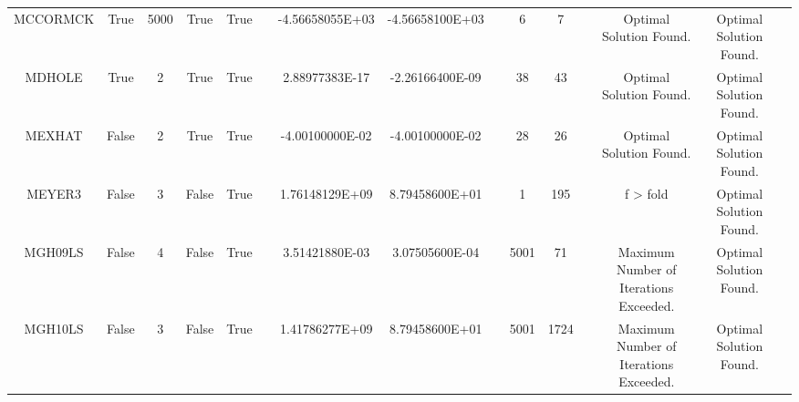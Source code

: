 \begin{longtable}{ccccccccccccccc}
	\cellcolor{default2} MCCORMCK& \cellcolor{default2} True& \cellcolor{default2} 5000& \cellcolor{default2} True& \cellcolor{default2} True& \cellcolor{header} & \cellcolor{ok} -4.56658055E+03& \cellcolor{best} -4.56658100E+03& \cellcolor{header} & \cellcolor{best} 6& \cellcolor{ok} 7& \cellcolor{header} & \cellcolor{default2} Optimal Solution Found.& \cellcolor{default2} Optimal Solution Found.& \cellcolor{header} \\
	\cellcolor{default1} MDHOLE& \cellcolor{default1} True& \cellcolor{default1} 2& \cellcolor{default1} True& \cellcolor{default1} True& \cellcolor{header} & \cellcolor{ok} 2.88977383E-17& \cellcolor{best} -2.26166400E-09& \cellcolor{header} & \cellcolor{best} 38& \cellcolor{ok} 43& \cellcolor{header} & \cellcolor{default1} Optimal Solution Found.& \cellcolor{default1} Optimal Solution Found.& \cellcolor{header} \\
	\cellcolor{default2} MEXHAT& \cellcolor{default2} False& \cellcolor{default2} 2& \cellcolor{default2} True& \cellcolor{default2} True& \cellcolor{header} & \cellcolor{best} -4.00100000E-02& \cellcolor{best} -4.00100000E-02& \cellcolor{header} & \cellcolor{ok} 28& \cellcolor{best} 26& \cellcolor{header} & \cellcolor{default2} Optimal Solution Found.& \cellcolor{default2} Optimal Solution Found.& \cellcolor{header} \\
	\cellcolor{default1} MEYER3& \cellcolor{default1} False& \cellcolor{default1} 3& \cellcolor{default1} False& \cellcolor{default1} True& \cellcolor{header} & \cellcolor{poor} 1.76148129E+09& \cellcolor{best} 8.79458600E+01& \cellcolor{header} & \cellcolor{best} 1& \cellcolor{poor} 195& \cellcolor{header} & \cellcolor{default1} f > fold& \cellcolor{default1} Optimal Solution Found.& \cellcolor{header} \\
	\cellcolor{default2} MGH09LS& \cellcolor{default2} False& \cellcolor{default2} 4& \cellcolor{default2} False& \cellcolor{default2} True& \cellcolor{header} & \cellcolor{poor} 3.51421880E-03& \cellcolor{best} 3.07505600E-04& \cellcolor{header} & \cellcolor{poor} 5001& \cellcolor{best} 71& \cellcolor{header} & \cellcolor{default2} Maximum Number of Iterations Exceeded.& \cellcolor{default2} Optimal Solution Found.& \cellcolor{header} \\
	\cellcolor{default1} MGH10LS& \cellcolor{default1} False& \cellcolor{default1} 3& \cellcolor{default1} False& \cellcolor{default1} True& \cellcolor{header} & \cellcolor{poor} 1.41786277E+09& \cellcolor{best} 8.79458600E+01& \cellcolor{header} & \cellcolor{poor} 5001& \cellcolor{best} 1724& \cellcolor{header} & \cellcolor{default1} Maximum Number of Iterations Exceeded.& \cellcolor{default1} Optimal Solution Found.& \cellcolor{header} \\

\end{longtable}
